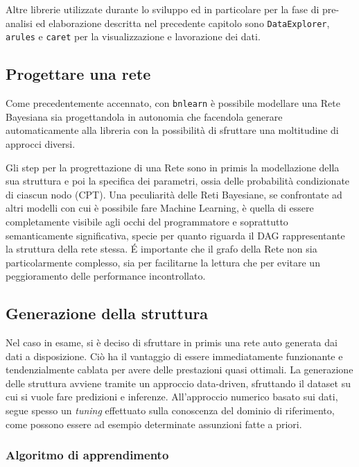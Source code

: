 \documentclass[hidelinks, 12pt]{article}
\begin{document}
\vspace{3ex}

Altre librerie utilizzate durante lo sviluppo ed in particolare per la fase di pre-analisi ed elaborazione descritta nel precedente capitolo sono \texttt{DataExplorer}, \texttt{arules} e \texttt{caret} per la visualizzazione e lavorazione dei dati.



\subsection{Progettare una rete}

Come precedentemente accennato, con \texttt{bnlearn} è possibile modellare una Rete Bayesiana sia progettandola in autonomia che facendola generare automaticamente alla libreria con la possibilità di sfruttare una moltitudine di approcci diversi.

Gli step per la progrettazione di una Rete sono in primis la modellazione della sua struttura e poi la specifica dei parametri, ossia delle probabilità condizionate di ciascun nodo (CPT). Una peculiarità delle Reti Bayesiane, se confrontate ad altri modelli con cui è possibile fare Machine Learning, è quella di essere completamente visibile agli occhi del programmatore e soprattutto semanticamente significativa, specie per quanto riguarda il DAG rappresentante la struttura della rete stessa. \'E importante che il grafo della Rete non sia particolarmente complesso, sia per facilitarne la lettura che per evitare un peggioramento delle performance incontrollato.



\subsection{Generazione della struttura}

Nel caso in esame, si è deciso di sfruttare in primis una rete auto generata dai dati a disposizione. Ciò ha il vantaggio di essere immediatamente funzionante e tendenzialmente cablata per avere delle prestazioni quasi ottimali. La generazione delle struttura avviene tramite un approccio data-driven, sfruttando il dataset su cui si vuole fare predizioni e inferenze. All'approccio numerico basato sui dati, segue spesso un \textit{tuning} effettuato sulla conoscenza del dominio di riferimento, come possono essere ad esempio determinate assunzioni fatte a priori.


\subsubsection{Algoritmo di apprendimento}
\end{document}
